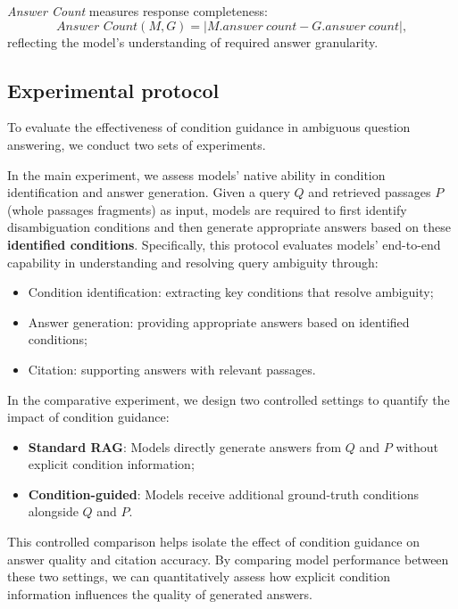 \textit{Answer Count} measures response completeness:
\begin{equation}
\textit{Answer Count}(M,G) = |M.answer\ count - G.answer\ count|,
\end{equation}
reflecting the model's understanding of required answer granularity.

\subsection{Experimental protocol}

To evaluate the effectiveness of condition guidance in ambiguous question answering, we conduct two sets of experiments. 

In the main experiment, we assess models' native ability in condition identification and answer generation. Given a query $Q$ and retrieved passages $P$ (whole passages fragments) as input, models are required to first identify disambiguation conditions and then generate appropriate answers based on these \textbf{identified conditions}. Specifically, this protocol evaluates models' end-to-end capability in understanding and resolving query ambiguity through:

\begin{itemize}
   \item Condition identification: extracting key conditions that resolve ambiguity;
   \item Answer generation: providing appropriate answers based on identified conditions;
   \item Citation: supporting answers with relevant passages.
\end{itemize}

In the comparative experiment, we design two controlled settings to quantify the impact of condition guidance:

\begin{itemize}
  \item \textbf{Standard RAG}: Models directly generate answers from $Q$ and $P$ without explicit condition information;
   \item \textbf{Condition-guided}: Models receive additional ground-truth conditions alongside $Q$ and $P$.
 
\end{itemize}

This controlled comparison helps isolate the effect of condition guidance on answer quality and citation accuracy. By comparing model performance between these two settings, we can quantitatively assess how explicit condition information influences the quality of generated answers.


